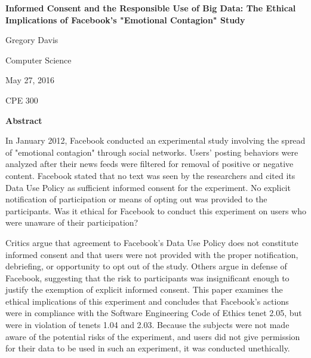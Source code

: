 \thispagestyle{plain}
\begin{titlepage}
	\begin{center}
    	\Large
    	\textbf{Informed Consent and the Responsible Use of Big Data: The Ethical Implications of Facebook's "Emotional Contagion" Study}
    
    	\vspace{0.9cm}
    	\large
    	Gregory Davis
    
    	\vspace{0.4cm}
    	Computer Science
    
    	\vspace{0.4cm}
    	May 27, 2016
    
    	\vspace{0.4cm}
    	CPE 300
    
    	\vspace{1.8cm}
    	\textbf{Abstract}
        
    	\vspace{0.4cm}
       \end{center}
In January 2012, Facebook conducted an experimental study involving the spread of "emotional contagion" through social networks.  Users' posting behaviors were analyzed after their news feeds were filtered for removal of positive or negative content.  Facebook stated that no text was seen by the researchers and cited its Data Use Policy as sufficient informed consent for the experiment.  No explicit notification of participation or means of opting out was provided to the participants.  Was it ethical for Facebook to conduct this experiment on users who were unaware of their participation?
\par Critics argue that agreement to Facebook's Data Use Policy does not constitute informed consent and that users were not provided with the proper notification, debriefing, or opportunity to opt out of the study.  Others argue in defense of Facebook, suggesting that the risk to participants was insignificant enough to justify the exemption of explicit informed consent.  This paper examines the ethical implications of this experiment and concludes that Facebook's actions were in compliance with the Software Engineering Code of Ethics tenet 2.05, but were in violation of tenets 1.04 and 2.03.  Because the subjects were not made aware of the potential risks of the experiment, and users did not give permission for their data to be used in such an experiment, it was conducted unethically.
\end{titlepage}